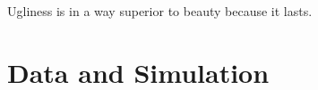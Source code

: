 \begin{savequote}[75mm]
Ugliness is in a way superior to beauty because it lasts.
\end{savequote}
\chapter{Data and Simulation}